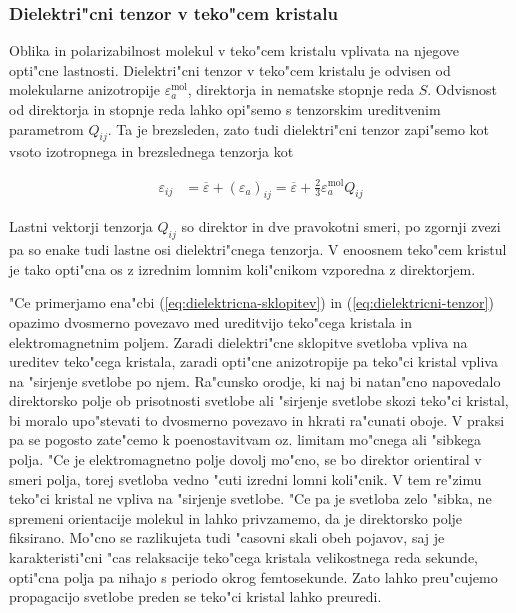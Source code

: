 \documentclass[a4paper,10pt]{article}
\begin{document}
\subsubsection{Dielektri"cni tenzor v teko"cem kristalu}
\label{sec:dielektricnost}
Oblika in polarizabilnost molekul v teko"cem kristalu vplivata na njegove opti"cne lastnosti. 
Dielektri"cni tenzor v teko"cem kristalu je odvisen od molekularne anizotropije $\varepsilon_{a}^{\mathrm{mol}}$, direktorja in nematske stopnje reda $S$. 
Odvisnost od direktorja in stopnje reda lahko opi"semo s tenzorskim ureditvenim parametrom $Q_{ij}$. 
Ta je brezsleden, zato tudi dielektri"cni tenzor zapi"semo kot vsoto izotropnega in brezslednega tenzorja kot\cite{degennes, ravnik-zumer-ldg}

\begin{align}
\label{eq:dielektricni-tenzor}
 \varepsilon_{ij} &= \overline\varepsilon + (\varepsilon_a)_{ij} = \overline\varepsilon + \frac{2}{3}\varepsilon_a^{\mathrm{mol}} Q_{ij}
\end{align}

Lastni vektorji tenzorja $Q_{ij}$ so direktor in dve pravokotni smeri, po zgornji zvezi pa so enake tudi lastne osi dielektri"cnega tenzorja. 
V enoosnem teko"cem kristul je tako opti"cna os z izrednim lomnim koli"cnikom vzporedna z direktorjem. 

"Ce primerjamo ena"cbi (\ref{eq:dielektricna-sklopitev}) in (\ref{eq:dielektricni-tenzor}) opazimo dvosmerno povezavo med ureditvijo teko"cega kristala in elektromagnetnim poljem. 
Zaradi dielektri"cne sklopitve svetloba vpliva na ureditev teko"cega kristala, zaradi opti"cne anizotropije pa teko"ci kristal vpliva na "sirjenje svetlobe po njem. 
Ra"cunsko orodje, ki naj bi natan"cno napovedalo direktorsko polje ob prisotnosti svetlobe ali "sirjenje svetlobe skozi teko"ci kristal, bi moralo upo"stevati to dvosmerno povezavo in hkrati ra"cunati oboje. 
V praksi pa se pogosto zate"cemo k poenostavitvam oz. limitam mo"cnega ali "sibkega polja. 
"Ce je elektromagnetno polje dovolj mo"cno, se bo direktor orientiral v smeri polja, torej svetloba vedno "cuti izredni lomni koli"cnik. 
V tem re"zimu teko"ci kristal ne vpliva na "sirjenje svetlobe. 
"Ce pa je svetloba zelo "sibka, ne spremeni orientacije molekul in lahko privzamemo, da je direktorsko polje fiksirano. 
Mo"cno se razlikujeta tudi "casovni skali obeh pojavov, saj je karakteristi"cni "cas relaksacije teko"cega kristala velikostnega reda sekunde, opti"cna polja pa nihajo s periodo okrog femtosekunde. 
Zato lahko preu"cujemo propagacijo svetlobe preden se teko"ci kristal lahko preuredi. 
\end{document}

